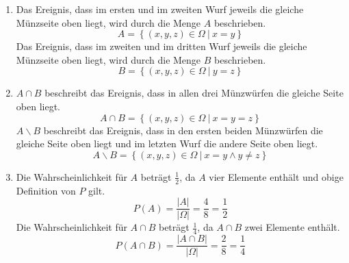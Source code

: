 \documentclass[a4paper]{scrartcl}
\begin{document}
\begin{enumerate}[label=\bfseries\arabic*.]
\begin{enumerate}[label=(\alph*)]
            \item
                Das Ereignis, dass im ersten und im zweiten Wurf jeweils die
                gleiche Münzseite oben liegt, wird durch die Menge $A$
                beschrieben.
                \begin{equation}
                    A = \left\{
                        (x, y, z) \in \Omega \ \vert \ 
                        x = y
                    \right\}
                \end{equation}
                Das Ereignis, dass im zweiten und im dritten Wurf jeweils die
                gleiche Münzseite oben liegt, wird durch die Menge $B$
                beschrieben.
                \begin{equation}
                    B = \left\{
                        (x, y, z) \in \Omega \ \vert \ 
                        y = z
                    \right\}
                \end{equation}

            \item
                $A \cap B$  beschreibt das Ereignis, dass in allen drei
                Münzwürfen die gleiche Seite oben liegt.
                \begin{equation}
                    A \cap B = \left\{
                        (x, y, z) \in \Omega \ \vert \ 
                        x = y = z
                    \right\}
                \end{equation}
                $A \backslash B$ beschreibt das Ereignis, dass in den ersten
                beiden Münzwürfen die gleiche Seite oben liegt und im letzten
                Wurf die andere Seite oben liegt.
                \begin{equation}
                    A \backslash B = \left\{
                        (x, y, z) \in \Omega \ \vert \ 
                        x = y \land y \neq z
                    \right\}
                \end{equation}

            \item
                Die Wahrscheinlichkeit für $A$ beträgt $\frac{1}{2}$, da $A$
                vier Elemente enthält und obige Definition von $P$ gilt.
                \begin{equation}
                    P(A) = \frac{|A|}{|\Omega|} = \frac{4}{8} = \frac{1}{2}
                \end{equation}
                Die Wahrscheinlichkeit für $A \cap B$ beträgt $\frac{1}{4}$,
                da $A \cap B$ zwei Elemente enthält.
                \begin{equation}
                    P(A \cap B) = \frac{|A \cap B|}{|\Omega|}
                    = \frac{2}{8} = \frac{1}{4}
                \end{equation}

        \end{enumerate}

\end{enumerate}
\end{document}
